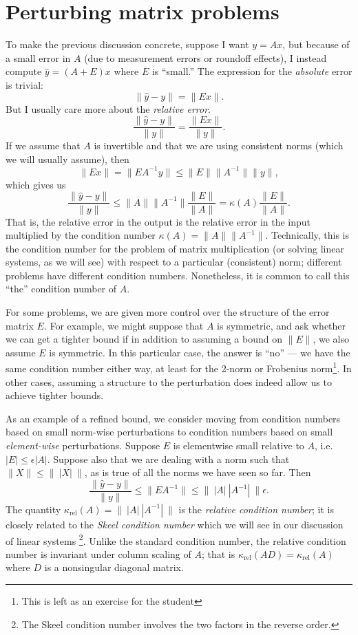 
\section{Perturbing matrix problems}

To make the previous discussion concrete, suppose I want $y = Ax$, but
because of a small error in $A$ (due to measurement errors or roundoff
effects), I instead compute $\hat{y} = (A+E)x$ where $E$ is ``small.''
The expression for the {\em absolute} error is trivial:
\[
  \|\hat{y}-y\| = \|Ex\|.
\]
But I usually care more about the {\em relative error}.
\[
  \frac{\|\hat{y}-y\|}{\|y\|} = \frac{\|Ex\|}{\|y\|}.
\]
If we assume that $A$ is invertible and that we are using consistent
norms (which we will usually assume), then
\[
  \|Ex\| = \|E A^{-1} y\| \leq \|E\| \|A^{-1}\| \|y\|,
\]
which gives us
\[
  \frac{\|\hat{y}-y\|}{\|y\|} \leq \|A\| \|A^{-1}\|
  \frac{\|E\|}{\|A\|} = \kappa(A) \frac{\|E\|}{\|A\|}.
\]
That is, the relative error in the output is the relative error in the
input multiplied by the condition number
$\kappa(A) = \|A\| \|A^{-1}\|$.
Technically, this is the condition number for the problem of matrix
multiplication (or solving linear systems, as we will see) with
respect to a particular (consistent) norm; different problems have
different condition numbers.  Nonetheless, it is common to call this
``the'' condition number of $A$.

For some problems, we are given more control over the structure of the
error matrix $E$.  For example, we might suppose that $A$ is symmetric,
and ask whether we can get a tighter bound if in addition to assuming a
bound on $\|E\|$, we also assume $E$ is symmetric.  In this particular
case, the answer is ``no'' --- we have the same condition number either
way, at least for the 2-norm or Frobenius norm\footnote{This is left as
an exercise for the student}.  In other cases, assuming a structure to
the perturbation does indeed allow us to achieve tighter bounds.

As an example of a refined bound, we consider moving from condition
numbers based on small norm-wise perturbations to condition numbers
based on small {\em element-wise} perturbations.  Suppose $E$ is
elementwise small relative to $A$, i.e.~$|E| \leq \epsilon |A|$.
Suppose also that we are dealing with a norm such
that $\|X\| \leq \|~|X|~\|$,
as is true of all the norms we have seen so far.  Then
\[
  \frac{\|\hat{y}-y\|}{\|y\|} \leq
  \|EA^{-1}\| \leq \|~|A|~|A^{-1}|~\| \epsilon.
\]
The quantity $\kappa_{\mathrm{rel}}(A) = \|~|A|~|A^{-1}|~\|$ is
the {\em relative condition number};
it is closely related to the {\em Skeel condition number} which we will
see in our discussion of linear systems%
\footnote{The Skeel condition number involves the two factors
in the reverse order.}.
Unlike the standard condition number, the relative condition number is
invariant under column scaling of $A$;
that is $\kappa_{\mathrm{rel}}(AD) = \kappa_{\mathrm{rel}}(A)$
where $D$ is a nonsingular diagonal matrix.

